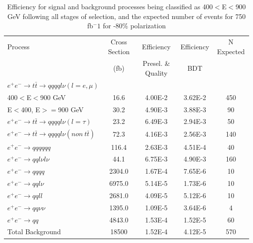 \begin{table}
  \centering
  \begin{tabular}{l | c | c | c | c}
    \toprule
     Process     & Cross Section & Efficiency & Efficiency & N Expected\\
     & (fb) & Presel. \& Quality & BDT & \\
     \midrule
    $e^+e^-\rightarrow t\bar{t} \rightarrow qqqql\nu (l=e,\mu)$&  &  & &\\
    400$<$E$<$900 GeV & 16.6 & 4.00E-2 & 3.62E-2 & 450\\
    E$<$400, E$>=$900 GeV & 30.2 & 4.90E-3 & 3.88E-3 & 90\\
    \midrule
    $e^+e^-\rightarrow t\bar{t} \rightarrow qqqql\nu (l=\tau)$& 23.2 & 6.49E-3 & 2.94E-3 & 50 \\
    \midrule
    $e^+e^-\rightarrow t\bar{t} \rightarrow qqqql\nu (non ~ t\bar{t})$& 72.3 & 4.16E-3 & 2.56E-3 & 140\\
    \midrule
    $e^+e^-\rightarrow qqqqqq$ & 116.4 & 2.63E-3 & 4.51E-4 & 40 \\
    \midrule
    $e^+e^-\rightarrow qql\nu l\nu$ & 44.1 & 6.75E-3 & 4.90E-3 & 160\\
    \midrule
    $e^+e^-\rightarrow qqqq$ & 2304.0 & 1.67E-4 & 7.65E-6 & 10 \\
    \midrule
    $e^+e^-\rightarrow qql\nu$ & 6975.0 & 5.14E-5 & 1.73E-6 & 10 \\
    \midrule
    $e^+e^-\rightarrow qqll$ & 2681.0 & 4.09E-5 & 5.12E-6 & 10 \\
    \midrule
    $e^+e^-\rightarrow qq\nu\nu$ & 1395.0 & 1.09E-5 & 3.64E-6 & 4 \\
    \midrule
    $e^+e^-\rightarrow qq$ & 4843.0 & 1.53E-4 & 1.52E-5 & 60\\
    \midrule
    \midrule
    Total Background & 18500 & 1.52E-4 & 4.12E-5 & 570  \\
    \bottomrule
  \end{tabular}
  \caption{Efficiency for signal and background processes being classified as 400$<$E$<$900 GeV following all stages of selection, and the expected number of events for 750 fb$^-1$ for -80\% polarization}
  \label{table:topfinalefficienciesnegLowE}
\end{table}

